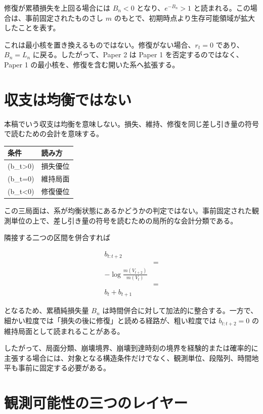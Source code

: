 \documentclass[12pt,a4paper]{article}
\begin{document}
修復が累積損失を上回る場合には \(B_{n}<0\) となり、\(e^{-B_{n}}>1\) と読まれる。この場合は、事前固定されたものさし \(m\) のもとで、初期時点より生存可能領域が拡大したことを表す。

これは最小核を置き換えるものではない。修復がない場合、\(r_{t}=0\) であり、\(B_{n}=L_{n}\) に戻る。したがって、Paper 2 は Paper 1 を否定するのではなく、Paper 1 の最小核を、修復を含む開いた系へ拡張する。

\section{収支は均衡ではない}\label{ux53ceux652fux306fux5747ux8861ux3067ux306fux306aux3044}

本稿でいう収支は均衡を意味しない。損失、維持、修復を同じ差し引き量の符号で読むための会計を意味する。

{\def\LTcaptype{table} %
\begin{longtable}[]{@{}ll@{}}
\toprule\noalign{}
条件 & 読み方 \\
\midrule\noalign{}
\endhead
\bottomrule\noalign{}
\endlastfoot
(b\_t\textgreater0) & 損失優位 \\
(b\_t=0) & 維持局面 \\
(b\_t\textless0) & 修復優位 \\
\end{longtable}
}

この三局面は、系が均衡状態にあるかどうかの判定ではない。事前固定された観測単位の上で、差し引き量の符号を読むための局所的な会計分類である。

隣接する二つの区間を併合すれば

\[
\begin{aligned}
b_{t:t+2} \\
&= \\
-\log\frac{m(V_{t+2})}{m(V_{t})} \\
&= \\
b_{t}+b_{t+1}
\end{aligned}
\]

となるため、累積純損失量 \(B_{n}\) は時間併合に対して加法的に整合する。一方で、細かい粒度では「損失の後に修復」と読める経路が、粗い粒度では \(b_{t:t+2}=0\) の維持局面として読まれることがある。

したがって、局面分類、崩壊境界、崩壊到達時刻の境界を経験的または確率的に主張する場合には、対象となる構造条件だけでなく、観測単位、段階列、時間地平も事前に固定する必要がある。

\section{観測可能性の三つのレイヤー}\label{ux89b3ux6e2cux53efux80fdux6027ux306eux4e09ux3064ux306eux30ecux30a4ux30e4ux30fc}
\end{document}

